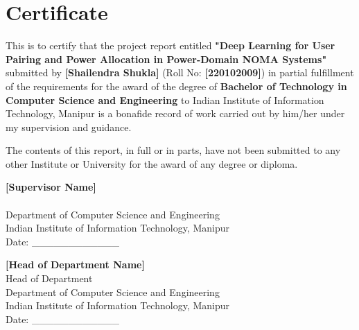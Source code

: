 \chapter*{Certificate}

\vspace{1cm}

This is to certify that the project report entitled \textbf{"Deep Learning for User Pairing and Power Allocation in Power-Domain NOMA Systems"} submitted by \textbf{[Shailendra Shukla]} (Roll No: \textbf{[220102009]}) in partial fulfillment of the requirements for the award of the degree of \textbf{Bachelor of Technology in Computer Science and Engineering} to Indian Institute of Information Technology, Manipur is a bonafide record of work carried out by him/her under my supervision and guidance.

\vspace{1cm}

The contents of this report, in full or in parts, have not been submitted to any other Institute or University for the award of any degree or diploma.

\vspace{3cm}

\begin{flushleft}
\textbf{[Supervisor Name]} \\
[Designation] \\
Department of Computer Science and Engineering \\
Indian Institute of Information Technology, Manipur \\
Date: \_\_\_\_\_\_\_\_\_\_\_\_
\end{flushleft}

\vspace{2cm}

\begin{flushleft}
\textbf{[Head of Department Name]} \\
Head of Department \\
Department of Computer Science and Engineering \\
Indian Institute of Information Technology, Manipur \\
Date: \_\_\_\_\_\_\_\_\_\_\_\_
\end{flushleft}

\newpage
